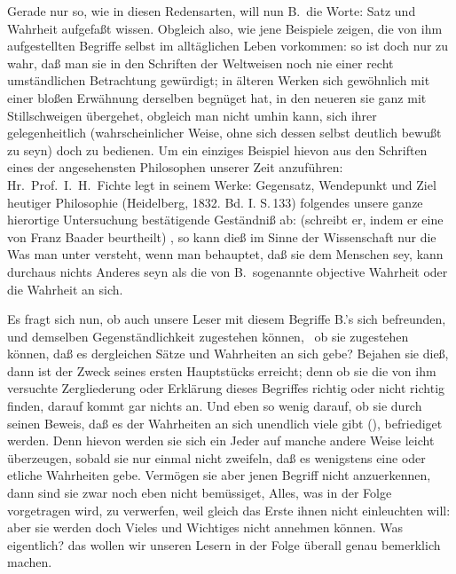 Gerade nur so, wie in diesen Redensarten, will nun B.\ die  Worte: Satz und Wahrheit aufgefaßt wissen. Obgleich also, wie jene Beispiele zeigen, die von ihm aufgestellten Begriffe selbst im alltäglichen Leben vorkommen: so ist doch nur zu wahr, daß man sie in den Schriften der Weltweisen noch nie einer recht umständlichen Betrachtung gewürdigt; in älteren Werken sich gewöhnlich mit einer bloßen Erwähnung derselben begnüget hat, in den neueren sie ganz mit Stillschweigen übergehet, obgleich man nicht umhin kann, sich ihrer gelegenheitlich (wahrscheinlicher Weise, ohne sich dessen selbst deutlich bewußt zu seyn) doch zu bedienen. Um ein einziges Beispiel hievon aus den Schriften eines der angesehensten Philosophen unserer Zeit anzuführen: Hr.~Prof.~I.~H.~Fichte legt in seinem Werke: Gegensatz, Wendepunkt und Ziel heutiger Philosophie (Heidelberg, 1832. Bd. I. S.\,133) folgendes unsere ganze hierortige Untersuchung bestätigende Geständniß ab:  (schreibt er, indem er eine  von Franz Baader beurtheilt) , so kann dieß im Sinne der Wissenschaft nur die  Was man unter  versteht, wenn man behauptet, daß sie dem Menschen  sey, kann durchaus nichts Anderes seyn als die von B.\ sogenannte objective Wahrheit oder die Wahrheit an sich. \par
Es fragt sich nun, ob auch unsere Leser mit diesem Begriffe B.'s sich befreunden, und demselben Gegenständlichkeit zugestehen können, \dh\  ob sie zugestehen können, daß es dergleichen Sätze und Wahrheiten an sich gebe? Bejahen sie dieß, dann ist der Zweck seines ersten Hauptstücks erreicht; denn ob sie die von ihm  versuchte Zergliederung oder Erklärung dieses Begriffes richtig oder nicht richtig finden, darauf kommt gar nichts an. Und eben so wenig darauf, ob sie durch seinen Beweis, daß es der Wahrheiten an sich unendlich viele gibt (), befriediget werden. Denn hievon werden sie sich ein Jeder auf manche andere Weise leicht überzeugen, sobald sie nur einmal nicht zweifeln,  daß es wenigstens eine oder etliche Wahrheiten gebe. Vermögen sie aber jenen Begriff nicht anzuerkennen, dann sind sie zwar noch eben nicht bemüssiget, Alles, was in der Folge vorgetragen wird, zu verwerfen, weil gleich das Erste ihnen nicht einleuchten will: aber sie werden doch Vieles und Wichtiges nicht annehmen können. Was eigentlich? das wollen wir unseren Lesern in der Folge überall genau bemerklich machen. \par
